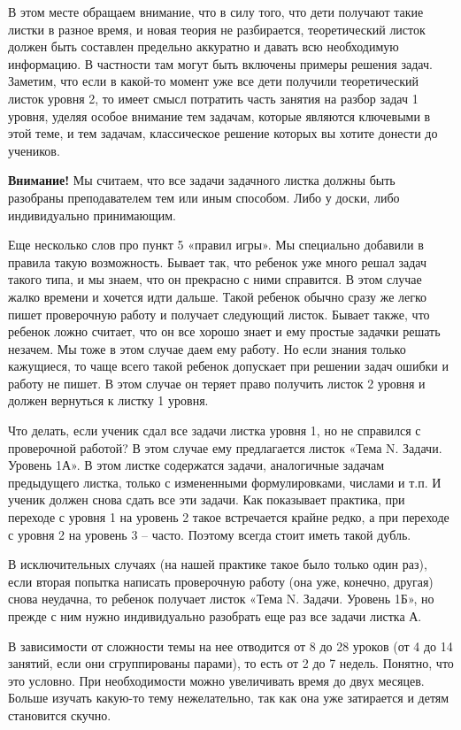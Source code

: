 В этом месте обращаем внимание, что в силу того, что дети получают такие листки в разное время, и новая теория не разбирается, теоретический листок должен быть составлен предельно аккуратно и давать всю необходимую информацию. В частности там могут быть включены примеры решения задач. Заметим, что если в какой-то момент уже все дети получили теоретический листок уровня 2, то имеет смысл потратить часть занятия на разбор задач 1 уровня, уделяя особое внимание тем задачам, которые являются ключевыми в этой теме, и тем задачам, классическое решение которых вы хотите донести до учеников.

\textbf{Внимание!} Мы считаем, что все задачи задачного листка должны быть разобраны преподавателем тем или иным способом. Либо у доски, либо индивидуально принимающим.

Еще несколько слов про пункт 5 «правил игры». Мы специально добавили в правила такую возможность. Бывает так, что ребенок уже много решал задач такого типа, и мы знаем, что он прекрасно с ними справится. В этом случае жалко времени и хочется идти дальше. Такой ребенок обычно сразу же легко пишет проверочную работу и получает следующий листок. Бывает также, что ребенок ложно считает, что он все хорошо знает и ему простые задачки решать незачем. Мы тоже в этом случае даем ему работу. Но если знания только кажущиеся, то чаще всего такой ребенок допускает при решении задач ошибки и работу не пишет. В этом случае он теряет право получить листок 2 уровня и должен вернуться к листку 1 уровня.

Что делать, если ученик сдал все задачи листка уровня 1, но не справился с проверочной работой? В этом случае ему предлагается листок «Тема N. Задачи. Уровень 1А». В этом листке содержатся задачи, аналогичные задачам предыдущего листка, только с измененными формулировками, числами и т.п. И ученик должен снова сдать все эти задачи. Как показывает практика, при переходе с уровня 1 на уровень 2 такое встречается крайне редко, а при переходе с уровня 2 на уровень 3 – часто. Поэтому всегда стоит иметь такой дубль.

В исключительных случаях (на нашей практике такое было только один раз), если вторая попытка написать проверочную работу (она уже, конечно, другая) снова неудачна, то ребенок получает листок «Тема N. Задачи. Уровень 1Б», но прежде с ним нужно индивидуально разобрать еще раз все задачи листка А.

В зависимости от сложности темы на нее отводится от 8 до 28 уроков (от 4 до 14 занятий, если они сгруппированы парами), то есть от 2 до 7 недель. Понятно, что это условно. При необходимости можно увеличивать время до двух месяцев. Больше изучать какую-то тему нежелательно, так как она уже затирается и детям становится скучно.

